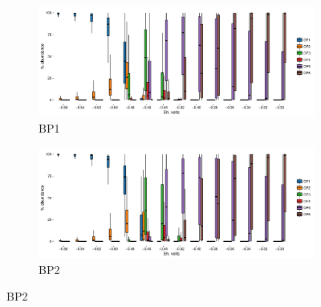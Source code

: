 \singlespace
\begin{figure}[h]
\centering

    \begin{subfigure}[b]{\linewidth}
      	\includegraphics[width=1\linewidth]{"figs_ch2/boxplot_ggplot_02bin Bison OF1 iter 999"}
      	\caption{BP1}
        \label{fig:BP1_mc}
    \end{subfigure}
    \begin{subfigure}[b]{\linewidth}
    	\includegraphics[width=1\linewidth]{"figs_ch2/boxplot_ggplot_02bin Bison OF2 iter 999"}
    	\caption{BP2}
        \label{fig:BP2_mc}
    \end{subfigure}
    
\end{figure}

\newpage

